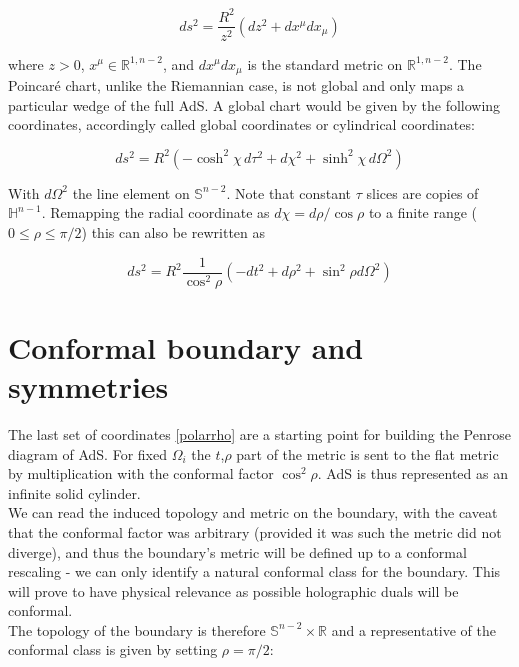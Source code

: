 \documentclass[11pt,a4paper,twoside,openright]{book}
\begin{document}
\begin{equation} \label{poincarechart}
ds^2 = \frac{R^2}{z^2} \left(dz^2 + dx^\mu dx_\mu \right)
\end{equation}

where $z>0$, $x^\mu \in \mathbb{R}^{1,n-2}$, and $dx^\mu dx_\mu$ is the standard metric on $\mathbb{R}^{1,n-2}$. The Poincaré chart, unlike the Riemannian case, is not global and only maps a particular wedge of the full AdS. A global chart would be given by the following coordinates, accordingly called global coordinates or cylindrical coordinates:

\begin{equation}
ds^2 = R^2 \left( -\cosh^2 \chi \, d\tau^2 + d\chi^2 + \sinh^2 \chi \, d\Omega^2 \right)
\end{equation}

With $d\Omega^2$ the line element on $\mathbb{S}^{n-2}$. Note that constant $\tau$ slices are copies of $\mathbb{H}^{n-1}$. Remapping the radial coordinate as $d\chi = d\rho/\cos\rho$ to a finite range ($0\le \rho \le \pi/2$) this can also be rewritten as

\begin{equation} \label{polarrho}
	ds^2 = R^2 \frac{1}{\cos^{2} \rho} \left( - dt^2 + d\rho^2 + \sin^2 \rho d\Omega^2  \right)
\end{equation}

\section{Conformal boundary and symmetries}

The last set of coordinates \ref{polarrho} are a starting point for building the Penrose diagram of AdS. For fixed $\Omega_i$ the $t$,$\rho$ part of the metric is sent to the flat metric by multiplication with the conformal factor $\cos^2 \rho$. AdS is thus represented as an infinite solid cylinder.\\

We can read the induced topology and metric on the boundary, with the caveat that the conformal factor was arbitrary (provided it was such the metric did not diverge), and thus the boundary's metric will be defined up to a conformal rescaling - we can only identify a natural conformal class for the boundary. This will prove to have physical relevance as possible holographic duals will be conformal.\\

The topology of the boundary is therefore $\mathbb{S}^{n-2} \times \mathbb{R}$ and a representative of the conformal class is given by setting $\rho = \pi/2$:
\end{document}

